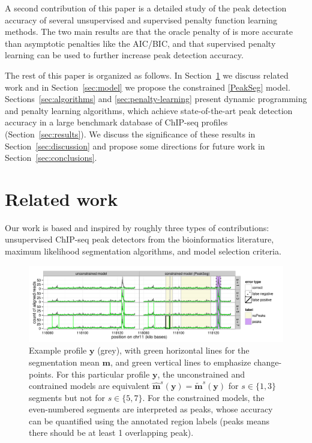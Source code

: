 \documentclass{article}
\begin{document}
A second contribution of this paper is a detailed study of the peak
detection accuracy of several unsupervised and supervised penalty
function learning methods. The two main results are that the oracle
penalty of \citet{cleynen2013segmentation} is more accurate than
asymptotic penalties like the AIC/BIC, and that supervised penalty
learning can be used to further increase peak detection accuracy.

The rest of this paper is organized as follows. In
Section~\ref{sec:related} we discuss related work and in
Section~\ref{sec:model} we propose the constrained \ref{PeakSeg}
model. Sections~\ref{sec:algorithms} and \ref{sec:penalty-learning}
present dynamic programming and penalty learning algorithms, which
achieve state-of-the-art peak detection accuracy in a large benchmark
database of ChIP-seq profiles (Section~\ref{sec:results}). We discuss
the significance of these results in Section~\ref{sec:discussion} and
propose some directions for future work in
Section~\ref{sec:conclusions}.

\section{Related work}
\label{sec:related}

Our work is based and inspired by roughly three types of contributions:
unsupervised ChIP-seq peak detectors from the bioinformatics
literature, maximum likelihood segmentation algorithms, and model
selection criteria.

\begin{figure}[b!]
  \centering
  \includegraphics[width=\textwidth]{figure-Segmentor-PeakSeg}
  \vskip -0.5cm
  \caption{Example profile $\mathbf y$ (grey), with green horizontal
    lines for the segmentation mean $\mathbf m$, and green vertical
    lines to emphasize change-points. For this particular profile
    $\mathbf y$, the unconstrained and contrained models are
    equivalent $\mathbf{\hat m}^s(\mathbf y) = \mathbf{\tilde
      m}^s(\mathbf y)$ for $s\in\{1, 3\}$ segments but not for
    $s\in\{5, 7\}$. For the constrained models, the even-numbered
    segments are interpreted as peaks, whose accuracy can be
    quantified using the annotated region labels
    (\textcolor{peaks}{peaks} means there should be at least 1
    overlapping peak).}
  \label{fig:Segmentor-PeakSeg}
\end{figure}
\end{document}
